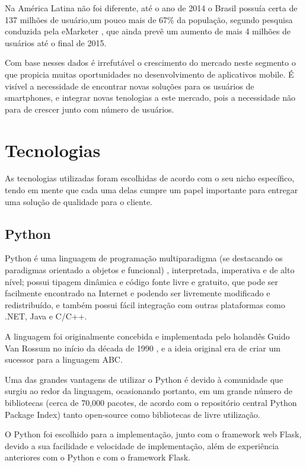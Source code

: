 \documentclass[
	article,			%
	11pt,				%
	oneside,			%
	a4paper,			%
	english,			%
	brazil,				%
	sumario=tradicional
	]{abntex2}
\begin{document}
Na América Latina não foi diferente, até o ano de 2014 o Brasil possuía certa
de 137 milhões de usuário,um pouco mais de 67\% da população, segundo pesquisa
conduzida pela eMarketer \cite{emarketer}, que ainda prevê um aumento de mais 4 milhões de
usuários até o final de 2015.

Com base nesses dados é irrefutável o crescimento do mercado neste segmento o
que propicia muitas oportunidades no desenvolvimento de aplicativos mobile.
É visível a necessidade de encontrar novas soluções para os usuários de
smartphones, e integrar novas tenologias a este mercado, pois a necessidade
 não para de crescer junto com  número de usuários.

\section{Tecnologias}

As tecnologias utilizadas foram escolhidas de acordo com o seu nicho específico,
tendo em mente que cada uma delas cumpre um papel importante para entregar uma
solução de qualidade para o cliente.

\subsection{Python}

Python é uma linguagem de programação multiparadigma (se destacando os paradigmas
orientado a objetos e funcional) , interpretada, imperativa e de alto nível;
possui tipagem dinâmica e código fonte livre \cite{pythonlicense} e gratuito, que pode ser
facilmente encontrado na Internet e podendo ser livremente modificado e
redistribuído, e também possui fácil integração com outras plataformas como
.NET, Java e C/C++.

A linguagem foi originalmente concebida e implementada pelo holandês Guido Van
Rossum no início da década de 1990 \cite{pythonlicense}, e a ideia original era de criar um sucessor para
a linguagem ABC.

Uma das grandes vantagens de utilizar o Python é devido à comunidade que surgiu
ao redor da linguagem, ocasionando portanto, em um grande número de bibliotecas
(cerca de 70,000 pacotes, de acordo com o repositório central Python Package
Index)\cite{pypi} tanto open-source como bibliotecas de livre utilização.

O Python foi escolhido para a implementação, junto com o framework web Flask,
devido a sua facilidade e velocidade de implementação, além de experiência
anteriores com o Python e com o framework Flask.
\end{document}
